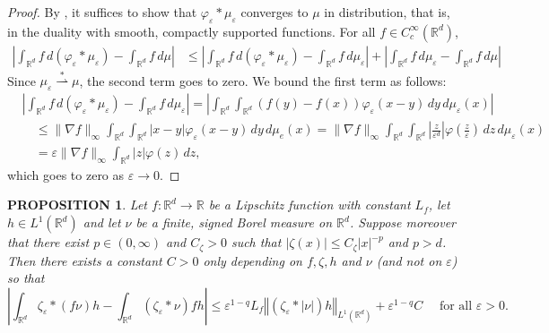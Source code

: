 \documentclass[11pt,leqno]{amsart}
\newtheorem{prop}[thm]{PROPOSITION}
\theoremstyle{definition}
\newcommand{\norm}[1]{\left\Vert#1\right\Vert}
\newcommand{\R}{{\mathord{\mathbb R}}}
\newcommand{\Rd}{{\mathord{\mathbb R}^d}}
\newcommand{\grad}{\nabla}
\newcommand{\wsto}{\stackrel{*}{\rightharpoonup}}
\def\e{\varepsilon}
\newcommand{\ird}{\int_{\mathord{\mathbb R}^d}}
\begin{document}
\begin{proof}
	By \cite[Remark 5.1.6]{AGS}, it suffices to show that $\varphi_\e *\mu_\e$ converges to $\mu$ in distribution, that is, in the duality with smooth, compactly supported functions. For all $f \in C^\infty_c(\Rd)$,
\begin{align*}
	\left| \ird f \,d (\varphi_\e *\mu_\e) - \ird f \,d\mu \right| &\leq \left| \ird f \,d (\varphi_\e *\mu_\e) - \ird f \,d\mu_\e \right| + \left| \ird f \,d\mu_\e - \ird f \,d\mu \right|
\end{align*}
Since $\mu_\e \wsto \mu$, the second term goes to zero. We bound the first term as follows:
\begin{align*}
& \left| \ird f \,d (\varphi_\e *\mu_\e) - \ird f \,d\mu_\e \right| = \left| \ird\ird (f(y) - f(x)) \varphi_\e(x-y)\,dy \,d \mu_\e(x) \right| \\
 &\quad \leq \|\grad f\|_\infty \ird\ird |x-y| \varphi_\e(x-y) \,dy \,d\mu_e(x) = \|\grad f\|_\infty \ird\ird \left| \frac{z}{\e^d} \right| \varphi \left(\frac{z}{\e} \right) \,dz \,d\mu_\e(x) \\
 &\quad = \e \|\grad f\|_\infty \ird |z | \varphi(z) \,dz ,
\end{align*}
which goes to zero as $\e \to 0$.
\end{proof}

\begin{prop} \label{move mollifier prop}
Let $f\colon \R^d \to \R$ be a Lipschitz function with constant $L_f$, let $h\in L^1(\R^d)$ and let $\nu$ be a finite, signed Borel measure on $\R^d$. Suppose moreover that there exist $p\in(0,\infty)$ and $C_\zeta>0$ such that $|\zeta(x)| \leq C_\zeta|x|^{-p}$ and $p>d$. Then there exists a constant $C >0$ only depending on $f,\zeta,h$ and $\nu$ (and not on $\e$) so that
\[ 
	\left| \ird \zeta_\e *(f\nu)h - \ird (\zeta_\e *\nu)fh \right|  \leq   \e^{1-q} L_f \norm{(\zeta_\e*|\nu|)h}_{L^1(\R^d)} + \e^{1-q} C \quad \text{ for all } \e >0.
\]
\end{prop}
\end{document}
